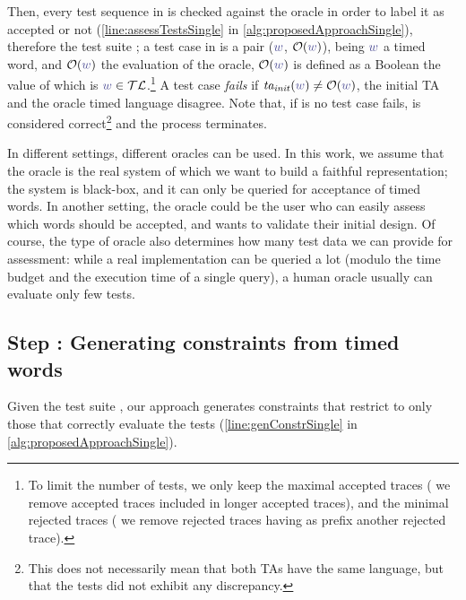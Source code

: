 \begin{tikzborder}{\cite{Gargantini16:validation}}
\begin{tikzborder}{\cite{gargantini_combinatorial_2017}}
\begin{tikzborder}{\cite{garn2019}}
\begin{tikzborder}{\cite{arcaini2019achieving}}
\begin{tikzborder}{\cite{arcaini2019varivolution}}
\begin{tikzborder}{}
Then, every test sequence in \testData is checked against the oracle in order to label it as accepted or not (\ref{line:assessTestsSingle} in \ref{alg:proposedApproachSingle}), therefore the test suite \testSuiteTA;
a test case in \testSuiteTA is a pair ($\word$, $\oracleTa(\word)$), being $\word$ a timed word, and $\oracleTa(\word)$ the evaluation of the oracle, \ie{} $\oracleTa(\word)$ is defined as a Boolean the value of which is $\word \in \TLoracle$.\footnote{To limit the number of tests, we only keep the maximal accepted traces (\ie{} we remove accepted traces included in longer accepted traces), and the minimal rejected traces (\ie{} we remove rejected traces having as prefix another rejected trace).}
A test case \emph{fails} if $\initTa(\word) \neq \oracleTa(\word)$, \ie{} the initial TA and the oracle timed language disagree. Note that, if is no test case fails, \initTa is considered correct\footnote{%
	This does not necessarily mean that both TAs have the same language, but that the tests did not exhibit any discrepancy.
}
and the process terminates.

In different settings, different oracles can be used. In this work, we assume that the oracle is the real system of which we want to build a faithful representation; the system is black-box, and it can only be queried for acceptance of timed words. In another setting, the oracle could be the user who can easily assess which words should be accepted, and wants to validate their initial design. Of course, the type of oracle also determines how many test data we can provide for assessment: while a real implementation can be queried a lot (modulo the time budget and the execution time of a single query), a human oracle usually can evaluate only few tests.
\end{tikzborder}

\subsection{Step : Generating constraints from timed words}\label{sec:genConstraints}

\begin{tikzborder}{}
Given the test suite \testSuiteTA, our approach generates constraints \ptaConstr that restrict \ptaProc to only those \tas that correctly evaluate the tests (\ref{line:genConstrSingle} in \ref{alg:proposedApproachSingle}).


\end{tikzborder}
\end{tikzborder}
\end{tikzborder}
\end{tikzborder}
\end{tikzborder}
\end{tikzborder}
